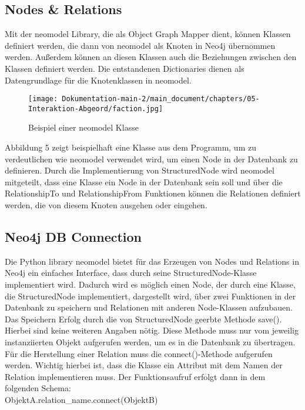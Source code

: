 \subsection{Nodes \& Relations}
Mit der neomodel Library, die als Object Graph Mapper dient, können Klassen definiert werden, die dann von neomodel als Knoten in Neo4j übernommen werden. Außerdem können an diesen Klassen auch die Beziehungen zwischen den Klassen definiert werden. Die entstandenen Dictionaries dienen als Datengrundlage für die Knotenklassen in neomodel.
\begin{figure}[htb]
    \centering
    \texttt{[image: Dokumentation-main-2/main\_document/chapters/05-Interaktion-Abgeord/faction.jpg]} 
    \caption{Beispiel einer neomodel Klasse}
    \label{fig:commentary}
\end{figure}
Abbildung 5 zeigt beispielhaft eine Klasse aus dem Programm, um zu verdeutlichen wie neomodel verwendet wird, um einen Node in der Datenbank zu definieren. Durch die Implementierung von StructuredNode wird neomodel mitgeteilt, dass eine Klasse ein Node in der Datenbank sein soll und über die RelationshipTo und RelationshipFrom Funktionen können die Relationen definiert werden, die von diesem Knoten ausgehen oder eingehen.
\subsection{Neo4j DB Connection}
Die Python library neomodel bietet für das Erzeugen von Nodes und Relations in Neo4j ein einfaches Interface, dass durch seine StructuredNode-Klasse implementiert wird. Dadurch wird es möglich einen Node, der durch eine Klasse, die StructuredNode implementiert, dargestellt wird, über zwei Funktionen in der Datenbank zu speichern und Relationen mit anderen Node-Klassen aufzubauen.\\
Das Speichern Erfolg durch die von StructuredNode geerbte Methode save(). Hierbei sind keine weiteren Angaben nötig. Diese Methode muss nur vom jeweilig instanziierten Objekt aufgerufen werden, um es in die Datenbank zu übertragen. Für die Herstellung einer Relation muss die connect()-Methode aufgerufen werden. Wichtig hierbei ist, dass die Klasse ein Attribut mit dem Namen der Relation implementieren muss. Der Funktionsaufruf erfolgt dann in dem folgenden Schema:\\
\newcommand\tab[1][1cm]{\hspace*{#1}}
\tab ObjektA.relation\_name.connect(ObjektB)
